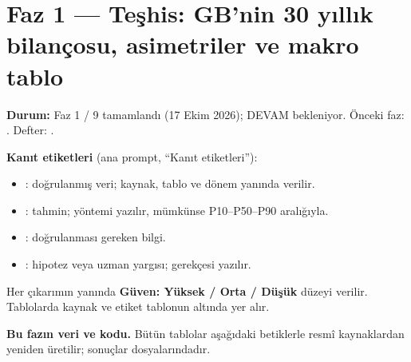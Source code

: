 \hypertarget{01_teshis}{%
\chapter{Faz 1 --- Teşhis: GB'nin 30 yıllık bilançosu, asimetriler ve makro tablo}\label{01_teshis}}

\textbf{Durum:} Faz 1 / 9 tamamlandı (17 Ekim 2026); DEVAM bekleniyor. Önceki faz: . Defter: .

\textbf{Kanıt etiketleri} (ana prompt, ``Kanıt etiketleri''):

\begin{itemize}
\tightlist
\item
  \etiketV{}: doğrulanmış veri; kaynak, tablo ve dönem yanında verilir.
\item
  \etiketT{}: tahmin; yöntemi yazılır, mümkünse P10--P50--P90 aralığıyla.
\item
  \etiketD{}: doğrulanması gereken bilgi.
\item
  \etiketH{}: hipotez veya uzman yargısı; gerekçesi yazılır.
\end{itemize}

Her çıkarımın yanında \textbf{Güven: Yüksek / Orta / Düşük} düzeyi verilir. Tablolarda kaynak ve etiket tablonun altında yer alır.

\textbf{Bu fazın veri ve kodu.} Bütün tablolar aşağıdaki betiklerle resmî kaynaklardan yeniden üretilir; sonuçlar  dosyalarındadır.

\begingroup\gbtablo\small

